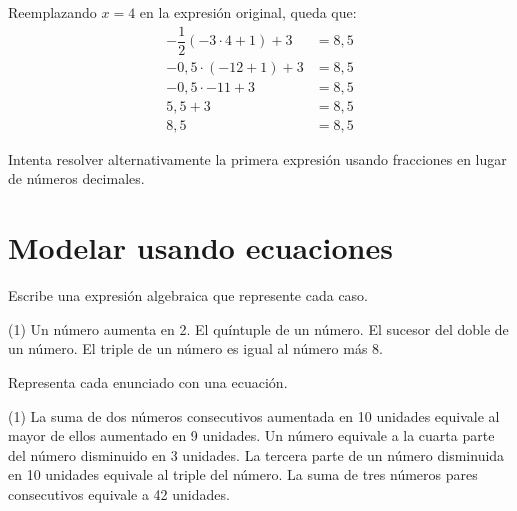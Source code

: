 \documentclass[options]{plantilla-material-v1}
\begin{document}
Reemplazando $x=4$ en la expresión original, queda que:
\begin{equation*}
  \begin{split}
    -\dfrac{1}{2}(-3\cdot4+1) +3 &= 8,5 \\
    -0,5\cdot(-12+1) + 3 &= 8,5 \\
    -0,5\cdot-11 + 3 &= 8,5 \\
    5,5 + 3 &= 8,5 \\
    8,5 &= 8,5
  \end{split}
\end{equation*}

Intenta resolver alternativamente la primera expresión usando fracciones en lugar 
de números decimales.

\section{Modelar usando ecuaciones}

Escribe una expresión algebraica que represente cada caso.
\begin{ejercicios}(1)
  \ejercicio Un número aumenta en 2.
  \ejercicio El quíntuple de un número.
  \ejercicio El sucesor del doble de un número.
  \ejercicio El triple de un número es igual al número más 8.
\end{ejercicios}

Representa cada enunciado con una ecuación.
\begin{ejercicios}(1)
  \ejercicio La suma de dos números consecutivos aumentada en 10 unidades equivale al mayor
  de ellos aumentado en 9 unidades.
  \ejercicio Un número equivale a la cuarta parte del número disminuido en 3 unidades.
  \ejercicio La tercera parte de un número disminuida en 10 unidades equivale al triple 
  del número.
  \ejercicio La suma de tres números pares consecutivos equivale a 42 unidades.
\end{ejercicios}
\end{document}
